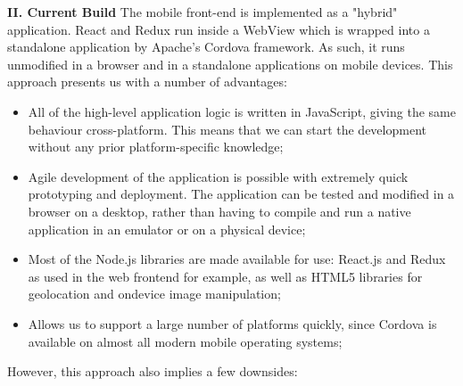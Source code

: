 \textbf{II. Current Build}
The mobile front-end is implemented as a "hybrid" application. React and Redux run inside a WebView which is wrapped into a standalone application by Apache's Cordova framework. As such, it runs unmodified in a browser and in a standalone applications on mobile devices. This approach presents us with a number of advantages:

\begin{itemize}
	\item All of the high-level application logic is written in JavaScript, giving the same behaviour cross-platform. This means that we can start the development without any prior platform-specific knowledge;
	\item Agile development of the application is possible with extremely quick prototyping and deployment. The application can be tested and modified in a browser on a desktop, rather than having to compile and run a native application in an emulator or on a physical device;
	\item Most of the Node.js libraries are made available for use: React.js and Redux as used in the web frontend for example, as well as HTML5 libraries for geolocation and ondevice image manipulation;
	\item Allows us to support a large number of platforms quickly, since Cordova is available on almost all modern mobile operating systems;
\end{itemize}

However, this approach also implies a few downsides:

